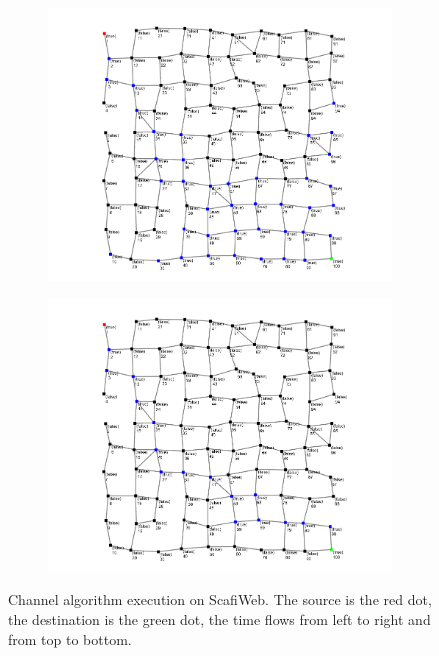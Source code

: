 \documentclass[12pt,a4paper,openright,twoside]{book}
\begin{document}
\begin{figure}[h!]
\begin{subfigure}[b]{0.49\textwidth}
    \end{subfigure}
    \hfill
    \begin{subfigure}[b]{0.49\textwidth}
        \centering
        \includegraphics[width=\textwidth]{figures/channel3.png}
    \end{subfigure}
    \hfill
    \begin{subfigure}[b]{0.49\textwidth}
        \centering
        \includegraphics[width=\textwidth]{figures/channel4.png}
    \end{subfigure}
\caption{Channel algorithm execution on ScafiWeb. The source is the red dot, the destination is the green dot, 
    the time flows from left to right and from top to bottom.}
\label{fig:channel-scafiweb}
\end{figure}
\end{document}

